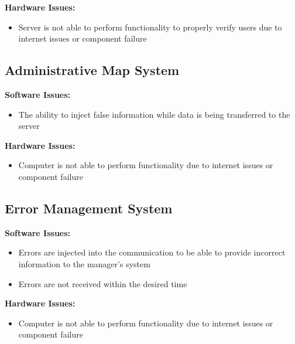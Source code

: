 \documentclass [10pt]{article}
\begin{document}
	\textbf{Hardware Issues:}
		\begin {itemize}
			\item Server is not able to perform functionality to properly verify users due to internet issues or component failure
		\end {itemize}
\subsection{Administrative Map System}
	\textbf{Software Issues:}
		\begin {itemize}
			\item The ability to inject false information while data is being transferred to the server 
		\end {itemize}
		
	\textbf{Hardware Issues:}
		\begin {itemize}
			\item Computer is not able to perform functionality due to internet issues or component failure
		\end {itemize}
\subsection{Error Management System}
	\textbf{Software Issues:}
		\begin {itemize}
			\item Errors are injected into the communication to be able to provide incorrect information to the manager's system
			\item Errors are not received within the desired time
		\end {itemize}
		
	\textbf{Hardware Issues:}
		\begin {itemize}
			\item Computer is not able to perform functionality due to internet issues or component failure
		\end {itemize}
\end{document}
